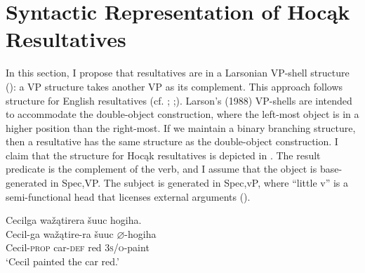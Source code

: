 \documentclass[output=paper]{LSP/langsci}
\begin{document}
\section{Syntactic Representation of Hocąk Resultatives}\label{sec:rosen:4}
 
In this section, I propose that resultatives are in a Larsonian VP-shell structure (\citealt{Larson1988}): a VP structure takes another VP as its complement. This approach follows  structure for English resultatives (cf. \citealt{Hoekstra1988};  \citealt{Carrier1992};\citealt{LevinRappaportHovav1995}). Larson's (1988) VP-shells are intended to accommodate the double-object construction, where the left-most object is in a higher position than the right-most. If we maintain a binary branching structure, then a resultative has the same structure as the double-object construction. I claim that the structure for Hocąk resultatives is depicted in . The result predicate is the complement of the verb, and I assume that the object is base-generated in Spec,VP. The subject is generated in Spec,vP, where ``little v'' is a semi-functional head that licenses external arguments (\citealt{Chomsky1995}).

\begin{exe}
\ex\label{ex:rosen:27}
\begin{xlist}

\ex \glll Cecilga wažątirera šuuc hogiha. \\
Cecil-ga  wažątire-ra šuuc {$\varnothing$}-hogiha \\
Cecil-\textsc{prop} car-\textsc{def} red \textsc{3s/o}-paint\\
\glt `Cecil painted the car red.'

\ex 
{\hspace{1em}}\newline
{}
\end{xlist}
\end{exe}
\end{document}
